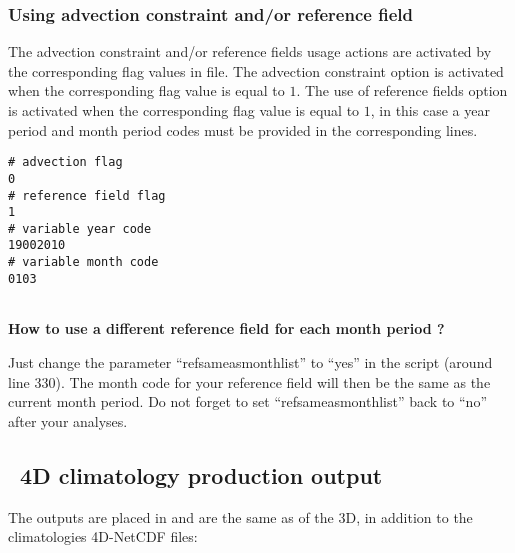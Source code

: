 \subsubsection{Using advection constraint and/or reference field }

The advection constraint and/or reference fields usage actions are activated by the corresponding flag values in  file.%
The advection constraint option is activated when the corresponding flag value is equal to $1$. 
The use of reference fields option is activated when the corresponding flag value is equal to $1$, in this case a year period  and month period codes must be provided in the corresponding lines.


\begin{center}
\begin{exfile}[H] %
\begin{footnotesize}
\begin{verbatim}
# advection flag
0
# reference field flag
1
# variable year code
19002010
# variable month code
0103
\end{verbatim}
\end{footnotesize}
\caption{}
\label{varlistexp2}
\end{exfile}
\end{center}

\begin{tabular}{|l|}
\hline
\hline
\end{tabular}

\textbf{How to use a different reference field for each month period ? }

Just change the parameter ``refsameasmonthlist'' to ``yes'' in the script  (around line 330). The month code for your reference field
will then be the same as the current month period. Do not forget to set ``refsameasmonthlist'' back to ``no'' after your analyses.

\pagebreak

\subsection{\diva\ 4D climatology production output}

The outputs are placed in  and are the same as of the \diva 3D, in addition to the climatologies 4D-NetCDF files:

